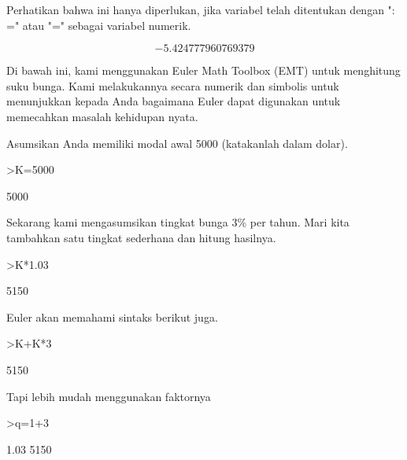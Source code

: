 \documentclass[a4paper,10pt]{article}
\begin{document}
\begin{eulernotebook}
\begin{eulercomment}
\begin{eulercomment}
\begin{eulercomment}
\begin{eulercomment}
\begin{eulercomment}
\begin{eulercomment}
\begin{eulercomment}
Perhatikan bahwa ini hanya diperlukan, jika variabel telah ditentukan
dengan ": =" atau "=" sebagai variabel numerik.
\end{eulercomment}
\begin{eulerformula}
\[
-5.424777960769379
\]
\end{eulerformula}
\begin{eulercomment}
Di bawah ini, kami menggunakan Euler Math Toolbox (EMT) untuk
menghitung suku bunga. Kami melakukannya secara numerik dan simbolis
untuk menunjukkan kepada Anda bagaimana Euler dapat digunakan untuk
memecahkan masalah kehidupan nyata.

Asumsikan Anda memiliki modal awal 5000 (katakanlah dalam dolar).
\end{eulercomment}
\begin{eulerprompt}
>K=5000
\end{eulerprompt}
\begin{euleroutput}
  5000
\end{euleroutput}
\begin{eulercomment}
Sekarang kami mengasumsikan tingkat bunga 3\% per tahun. Mari kita
tambahkan satu tingkat sederhana dan hitung hasilnya.
\end{eulercomment}
\begin{eulerprompt}
>K*1.03
\end{eulerprompt}
\begin{euleroutput}
  5150
\end{euleroutput}
\begin{eulercomment}
Euler akan memahami sintaks berikut juga.
\end{eulercomment}
\begin{eulerprompt}
>K+K*3%
\end{eulerprompt}
\begin{euleroutput}
  5150
\end{euleroutput}
\begin{eulercomment}
Tapi lebih mudah menggunakan faktornya
\end{eulercomment}
\begin{eulerprompt}
>q=1+3%
\end{eulerprompt}
\begin{euleroutput}
  1.03
  5150
\end{euleroutput}
\begin{eulercomment}

\end{eulercomment}
\end{eulercomment}
\end{eulercomment}
\end{eulercomment}
\end{eulercomment}
\end{eulercomment}
\end{eulercomment}
\end{eulernotebook}
\end{document}
